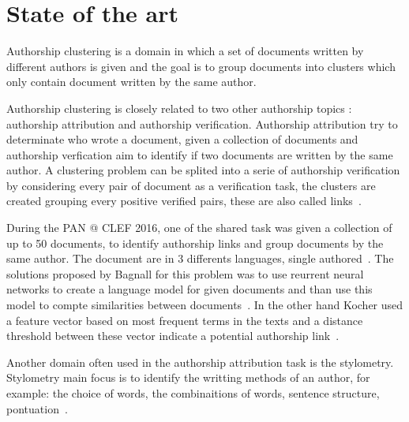 \section{State of the art}

Authorship clustering is a domain in which a set of documents written by different authors is given and the goal is to group documents into clusters which only contain document written by the same author.

Authorship clustering is closely related to two other authorship topics : authorship attribution and authorship verification.
Authorship attribution try to determinate who wrote a document, given a collection of documents and authorship verfication aim to identify if two documents are written by the same author.
A clustering problem can be splited into a serie of authorship verification by considering every pair of document as a verification task, the clusters are created grouping every positive verified pairs, these are also called links~\cite{pan16_clustering_site}.

During the PAN @ CLEF 2016, one of the shared task was given a collection of up to 50 documents, to identify authorship links and group documents by the same author.
The document are in 3 differents languages, single authored~\cite{pan16}.
The solutions proposed by Bagnall for this problem was to use reurrent neural networks to create a language model for given documents and than use this model to compte similarities between documents~\cite{bagnall_pan16}.
In the other hand Kocher used a feature vector based on most frequent terms in the texts and a distance threshold between these vector indicate a potential authorship link~\cite{kocher_pan16}.

Another domain often used in the authorship attribution task is the stylometry.
Stylometry main focus is to identify the writting methods of an author, for example: the choice of words, the combinaitions of words, sentence structure, pontuation~\cite{savoy_stylo}.

